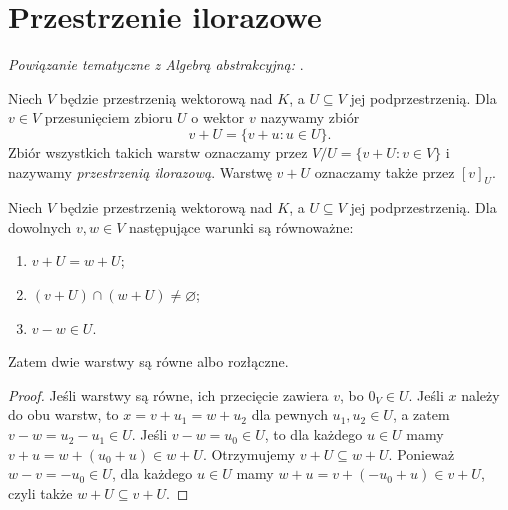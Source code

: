 \section{Przestrzenie ilorazowe}
\label{sec:lin2-ilorazy}

\noindent\emph{Powiązanie tematyczne z Algebrą abstrakcyjną:} .


\begin{definicja}
\label{def:lin2-iloraz}
Niech \(V\) będzie przestrzenią wektorową nad \(K\),
a \(U\subseteq V\) jej podprzestrzenią.
Dla \(v\in V\) przesunięciem zbioru \(U\)
o wektor \(v\) nazywamy zbiór
\[
 v+U=\{v+u:u\in U\}.
\]
Zbiór wszystkich takich warstw oznaczamy przez
\(V/U=\{v+U:v\in V\}\)
i nazywamy \emph{przestrzenią ilorazową}.
Warstwę \(v+U\) oznaczamy także przez \([v]_U\).
\end{definicja}

\begin{lemat}
\label{lem:lin2-warstwy}
Niech \(V\) będzie przestrzenią wektorową nad \(K\),
a \(U\subseteq V\) jej podprzestrzenią.
Dla dowolnych \(v,w\in V\)
następujące warunki są równoważne:
\begin{enumerate}[label=(\roman*)]
\item \(v+U=w+U\);
\item \((v+U)\cap(w+U)\neq\varnothing\);
\item \(v-w\in U\).
\end{enumerate}
Zatem dwie warstwy są równe albo rozłączne.
\end{lemat}
\begin{proof}
Jeśli warstwy są równe, ich przecięcie
zawiera \(v\), bo \(0_V\in U\).
Jeśli \(x\) należy do obu warstw, to
\(x=v+u_1=w+u_2\) dla pewnych \(u_1,u_2\in U\),
a zatem \(v-w=u_2-u_1\in U\).
Jeśli \(v-w=u_0\in U\), to
dla każdego \(u\in U\)
mamy \(v+u=w+(u_0+u)\in w+U\).
Otrzymujemy \(v+U\subseteq w+U\).
Ponieważ \(w-v=-u_0\in U\), dla każdego \(u\in U\)
mamy \(w+u=v+(-u_0+u)\in v+U\),
czyli także \(w+U\subseteq v+U\).
\end{proof}


